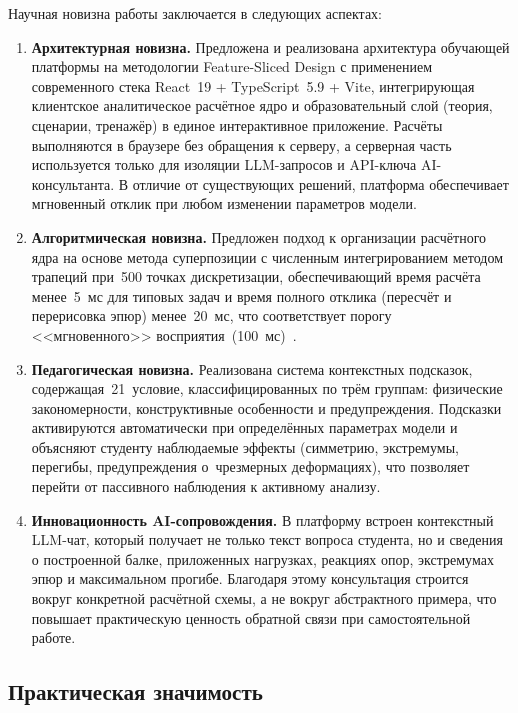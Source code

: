 Научная новизна работы заключается в следующих аспектах:
\begin{enumerate}
  \item \textbf{Архитектурная новизна.} Предложена и реализована архитектура обучающей платформы на методологии Feature-Sliced Design с применением современного стека React~19 + TypeScript~5.9 + Vite, интегрирующая клиентское аналитическое расчётное ядро и образовательный слой (теория, сценарии, тренажёр) в единое интерактивное приложение. Расчёты выполняются в браузере без обращения к серверу, а серверная часть используется только для изоляции LLM-запросов и API-ключа AI-консультанта. В отличие от существующих решений, платформа обеспечивает мгновенный отклик при любом изменении параметров модели.

  \item \textbf{Алгоритмическая новизна.} Предложен подход к организации расчётного ядра на основе метода суперпозиции с численным интегрированием методом трапеций при~500 точках дискретизации, обеспечивающий время расчёта менее~5~мс для типовых задач и время полного отклика (пересчёт и перерисовка эпюр) менее~20~мс, что соответствует порогу <<мгновенного>> восприятия~(100~мс)~\cite{flanagan2020}.

  \item \textbf{Педагогическая новизна.} Реализована система контекстных подсказок, содержащая~21~условие, классифицированных по трём группам: физические закономерности, конструктивные особенности и предупреждения. Подсказки активируются автоматически при определённых параметрах модели и объясняют студенту наблюдаемые эффекты (симметрию, экстремумы, перегибы, предупреждения о~чрезмерных деформациях), что позволяет перейти от пассивного наблюдения к активному анализу.

  \item \textbf{Инновационность AI-сопровождения.} В платформу встроен контекстный LLM-чат, который получает не только текст вопроса студента, но и сведения о построенной балке, приложенных нагрузках, реакциях опор, экстремумах эпюр и максимальном прогибе. Благодаря этому консультация строится вокруг конкретной расчётной схемы, а не вокруг абстрактного примера, что повышает практическую ценность обратной связи при самостоятельной работе.
\end{enumerate}

\subsection*{Практическая значимость}

